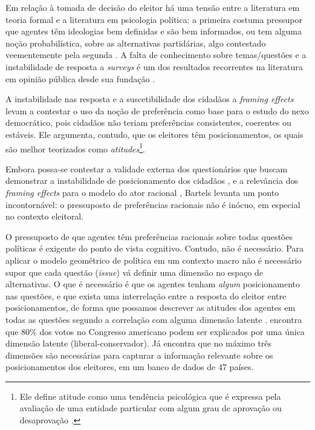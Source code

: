 Em relação à tomada de decisão do eleitor há uma tensão entre a literatura em
teoria formal e a literatura em psicologia política: a primeira costuma
pressupor que agentes têm ideologias bem definidas e são bem informados, ou tem
alguma noção probabilística, sobre as alternativas partidárias, algo contestado
veementemente pela segunda \cite[p.5]{bendor2011behavioral}. A falta de
conhecimento sobre temas/questões e a instabilidade de resposta a
\textit{surveys} é um dos resultados recorrentes na literatura em opinião
pública desde sua fundação \cite{berelson1952democratic, converse2006nature,
  zaller1992simple, kuklinski2000misinformation}.

A instabilidade nas resposta e  a suscetibilidade dos cidadãos a \textit{framing
  effects} levam 
a contestar o uso da noção de preferência como base para o estudo do nexo
democrático, pois cidadãos não teriam preferências consistentes, coerentes ou
estáveis. Ele argumenta, contudo, que os eleitores têm posicionamentos, os quais
são melhor teorizados como \textit{atitudes}\footnote{ Ele define atitude como
  uma tendência psicológica que é expressa pela avaliação de uma entidade
  particular com algum grau de aprovação ou desaprovação
  \cite[p.52]{bartels2003democracy}.}.

Embora possa-se contestar a validade externa dos questionários que buscam
demonstrar a instabilidade de posicionamento dos cidadãos
\cite{druckman2012public}, e a relevância dos \textit{framing effects} para o
modelo do ator racional \cite[p. 107]{gintis2016individuality}, Bartels levanta
um ponto incontornável: o pressuposto de preferências racionais não é inócuo, em
especial no contexto eleitoral.

O pressuposto de que agentes têm preferências racionais sobre todas questões
políticas é exigente do ponto de vista cognitivo. Contudo, não é necessário.
Para aplicar o modelo geométrico de política em um contexto macro não é
necessário supor que cada questão (\textit{issue}) vá definir uma dimensão no
espaço de alternativas. O que é necessário é que os agentes tenham
\textit{algum} posicionamento nas questões, e que exista uma interrelação entre
a resposta do eleitor entre posicionamentos, de forma que possamos descrever as
atitudes dos agentes em todas as questões segundo a correlação com alguma
dimensão latente \cite{poole2008scaling,laver2014measuring}.
 encontra que $80\%$ dos votos no Congresso
americano podem ser explicados por uma única dimensão latente
(liberal-conservador). Já  encontra que no máximo
três dimensões são necessárias para capturar a informação relevante sobre os
posicionamentos dos eleitores, em um banco de dados de 47 países.

